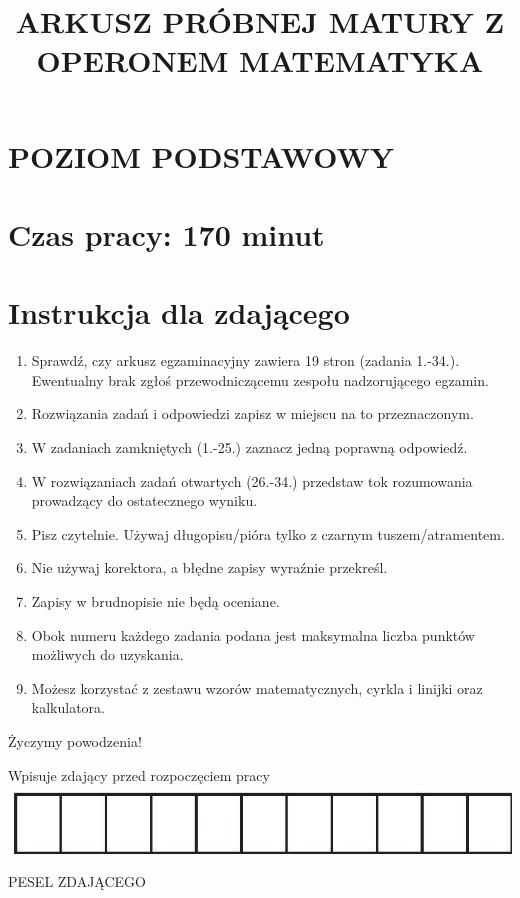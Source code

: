\documentclass[10pt]{article}
\title{ARKUSZ PRÓBNEJ MATURY Z OPERONEM MATEMATYKA }
\author{}
\date{}
\begin{document}
\maketitle
\section*{POZIOM PODSTAWOWY}
\section*{Czas pracy: 170 minut}
\section*{Instrukcja dla zdającego}
\begin{enumerate}
  \item Sprawdź, czy arkusz egzaminacyjny zawiera 19 stron (zadania 1.-34.). Ewentualny brak zgłoś przewodniczącemu zespołu nadzorującego egzamin.
  \item Rozwiązania zadań i odpowiedzi zapisz w miejscu na to przeznaczonym.
  \item W zadaniach zamkniętych (1.-25.) zaznacz jedną poprawną odpowiedź.
  \item W rozwiązaniach zadań otwartych (26.-34.) przedstaw tok rozumowania prowadzący do ostatecznego wyniku.
  \item Pisz czytelnie. Używaj długopisu/pióra tylko z czarnym tuszem/atramentem.
  \item Nie używaj korektora, a błędne zapisy wyraźnie przekreśl.
  \item Zapisy w brudnopisie nie będą oceniane.
  \item Obok numeru każdego zadania podana jest maksymalna liczba punktów możliwych do uzyskania.
  \item Możesz korzystać z zestawu wzorów matematycznych, cyrkla i linijki oraz kalkulatora.
\end{enumerate}

Życzymy powodzenia!

Wpisuje zdający przed rozpoczęciem pracy\\
\includegraphics[max width=\textwidth, center]{2024_11_21_99eb8e6624b497a5af43g-01(1)}

PESEL ZDAJĄCEGO
\end{document}
